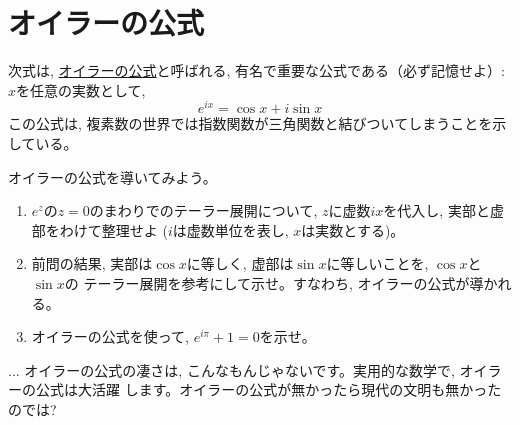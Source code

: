 \section{オイラーの公式}

次式は, \underline{オイラーの公式}と呼ばれる, 
有名で重要な公式である（必ず記憶せよ）: $x$を任意の実数として, 
\begin{equation}
e^{ix}=\cos x + i \sin x\label{eq:EulerFormula}
\end{equation}
この公式は, 複素数の世界では指数関数が三角関数と結びついてしまうことを示している。\mv

\begin{q}\label{q:univ_Euler0} オイラーの公式を導いてみよう。
\begin{enumerate}
\item $e^z$の$z=0$のまわりでのテーラー展開について, $z$に虚数$ix$を代入し, 実部と虚部をわけて整理せよ
($i$は虚数単位を表し, $x$は実数とする)。
\item 前問の結果, 実部は$\cos x$に等しく, 虚部は$\sin x$に等しいことを, $\cos x$と$\sin x$の
テーラー展開を参考にして示せ。すなわち, オイラーの公式が導かれる。
\item オイラーの公式を使って, $e^{i\pi}+1=0$を示せ。
\end{enumerate}\end{q}
\hv


\begin{faq}{\small {} ... オイラーの公式の凄さは, 
こんなもんじゃないです。実用的な数学で, オイラーの公式は大活躍
します。オイラーの公式が無かったら現代の文明も無かったのでは?}\end{faq}
\mv

